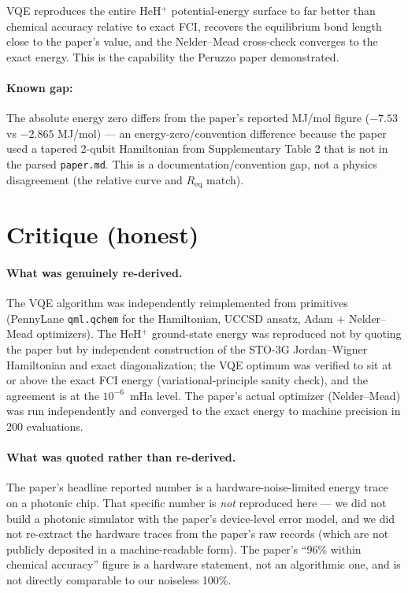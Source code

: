 \documentclass[11pt]{article}
\begin{document}
VQE reproduces the entire HeH$^+$ potential-energy surface to far better than chemical accuracy relative to exact FCI, recovers the equilibrium bond length close to the paper's value, and the Nelder--Mead cross-check converges to the exact energy. This is the capability the Peruzzo paper demonstrated.

\paragraph{Known gap:}
The absolute energy zero differs from the paper's reported MJ/mol figure ($-7.53$ vs $-2.865$ MJ/mol) --- an energy-zero/convention difference because the paper used a tapered 2-qubit Hamiltonian from Supplementary Table 2 that is not in the parsed \verb|paper.md|. This is a documentation/convention gap, not a physics disagreement (the relative curve and $R_\mathrm{eq}$ match).

\section{Critique (honest)}

\paragraph{What was genuinely re-derived.}
The VQE algorithm was independently reimplemented from primitives (PennyLane \verb|qml.qchem| for the Hamiltonian, UCCSD ansatz, Adam + Nelder--Mead optimizers). The HeH$^+$ ground-state energy was reproduced not by quoting the paper but by independent construction of the STO-3G Jordan--Wigner Hamiltonian and exact diagonalization; the VQE optimum was verified to sit at or above the exact FCI energy (variational-principle sanity check), and the agreement is at the $10^{-6}$~mHa level. The paper's actual optimizer (Nelder--Mead) was run independently and converged to the exact energy to machine precision in 200 evaluations.

\paragraph{What was quoted rather than re-derived.}
The paper's headline reported number is a hardware-noise-limited energy trace on a photonic chip. That specific number is \emph{not} reproduced here --- we did not build a photonic simulator with the paper's device-level error model, and we did not re-extract the hardware traces from the paper's raw records (which are not publicly deposited in a machine-readable form). The paper's ``96\% within chemical accuracy'' figure is a hardware statement, not an algorithmic one, and is not directly comparable to our noiseless 100\%.
\end{document}
